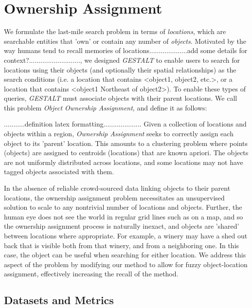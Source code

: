 \section{Ownership Assignment}
\label{section:ownership}


We formulate the last-mile search problem in terms of \textit{locations}, which are searchable entities that 'own' or contain any number of \textit{objects}. Motivated by the way humans tend to recall memories of locations....................add some details for context?..........................., we designed \emph{GESTALT} to enable users to search for locations using their objects (and optionally their spatial relationships) as the search conditions (i.e. a location that contains <object1, object2, etc.>, or a location that contains <object1 Northeast of object2>). To enable these types of queries, \emph{GESTALT} must associate objects with their parent locations.
We call this problem \textit{Object Ownership Assignment}, and define it as follows:

...........definition latex formatting.................... Given a collection of locations and objects within a region, \emph{Ownership Assignment} seeks to correctly assign each object to its 'parent' location. This amounts to a clustering problem where points (objects) are assigned to centroids (locations) that are known apriori. The objects are not uniformly distributed across locations, and some locations may not have tagged objects associated with them. 


In the absence of reliable crowd-sourced data linking objects to their parent locations, the ownership assignment problem necessitates an unsupervised solution to scale to any nontrivial number of locations and objects. Further, the human eye does not see the world in regular grid lines such as on a map, and so the ownership assignment process is naturally inexact, and objects are 'shared' between locations where appropriate. For example, a winery may have a shed out back that is visible both from that winery, and from a neighboring one. In this case, the object can be useful when searching for either location. We address this aspect of the problem by modifying our method to allow for fuzzy object-location assignment, effectively increasing the recall of the method. 


\subsection{Datasets and Metrics}

